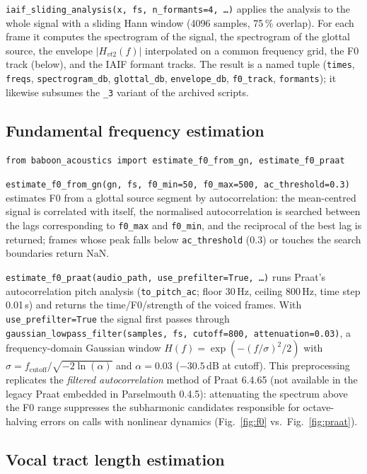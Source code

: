 \documentclass[11pt,a4paper]{article}
\newcommand{\file}[1]{\texttt{#1}}
\begin{document}
\file{iaif\_sliding\_analysis(x, fs, n\_formants=4, \ldots)} applies the
analysis to the whole signal with a sliding Hann window (4096 samples,
75\,\% overlap). For each frame it computes the spectrogram of the
signal, the spectrogram of the glottal source, the envelope
$|H_{vt2}(f)|$ interpolated on a common frequency grid, the F0 track
(below), and the IAIF formant tracks. The result is a named tuple
(\file{times}, \file{freqs}, \file{spectrogram\_db}, \file{glottal\_db},
\file{envelope\_db}, \file{f0\_track}, \file{formants}); it likewise
subsumes the \file{\_3} variant of the archived scripts.

\subsection{Fundamental frequency estimation}

\begin{lstlisting}
from baboon_acoustics import estimate_f0_from_gn, estimate_f0_praat
\end{lstlisting}
\file{estimate\_f0\_from\_gn(gn, fs, f0\_min=50, f0\_max=500,
ac\_threshold=0.3)} estimates F0 from a glottal source segment by
autocorrelation: the mean-centred signal is correlated with itself, the
normalised autocorrelation is searched between the lags corresponding to
\file{f0\_max} and \file{f0\_min}, and the reciprocal of the best lag is
returned; frames whose peak falls below \file{ac\_threshold} (0.3) or
touches the search boundaries return NaN.

\file{estimate\_f0\_praat(audio\_path, use\_prefilter=True, \ldots)}
runs Praat's autocorrelation pitch analysis (\file{to\_pitch\_ac};
floor 30\,Hz, ceiling 800\,Hz, time step 0.01\,s) and returns the
time/F0/strength of the voiced frames. With \file{use\_prefilter=True}
the signal first passes through
\file{gaussian\_lowpass\_filter(samples, fs, cutoff=800,
attenuation=0.03)}, a frequency-domain Gaussian window
$H(f) = \exp\!\left(-(f/\sigma)^2/2\right)$ with
$\sigma = f_{\mathrm{cutoff}} / \sqrt{-2\ln(\alpha)}$ and $\alpha = 0.03$
($-30.5$\,dB at cutoff). This preprocessing replicates the
\emph{filtered autocorrelation} method of Praat 6.4.65 (not available in
the legacy Praat embedded in Parselmouth 0.4.5): attenuating the
spectrum above the F0 range suppresses the subharmonic candidates
responsible for octave-halving errors on calls with nonlinear dynamics
(Fig.~\ref{fig:f0} vs.\ Fig.~\ref{fig:praat}).

\subsection{Vocal tract length estimation}
\end{document}
